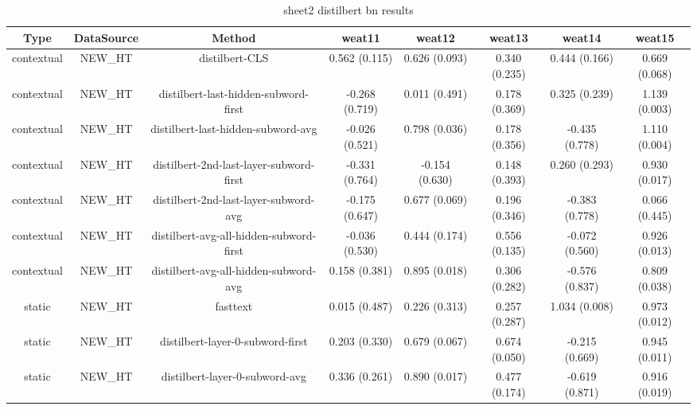 \begin{sidewaystable}[htb]
    \centering
    \caption{sheet2 distilbert bn results}
    \label{appendix_tab:sheet2_distilbert_bn_results}
    \small
    \begin{tabular}{@{}cccccccc@{}}
        \toprule
        Type & DataSource & Method & weat11 & weat12 & weat13 & weat14 & weat15 \\
        \midrule
        contextual & NEW\_HT & distilbert-CLS & 0.562 (0.115) & 0.626 (0.093) & 0.340 (0.235) & 0.444 (0.166) & 0.669 (0.068) \\
        contextual & NEW\_HT & distilbert-last-hidden-subword-first & -0.268 (0.719) & 0.011 (0.491) & 0.178 (0.369) & 0.325 (0.239) & 1.139 (0.003) \\
        contextual & NEW\_HT & distilbert-last-hidden-subword-avg & -0.026 (0.521) & 0.798 (0.036) & 0.178 (0.356) & -0.435 (0.778) & 1.110 (0.004) \\
        contextual & NEW\_HT & distilbert-2nd-last-layer-subword-first & -0.331 (0.764) & -0.154 (0.630) & 0.148 (0.393) & 0.260 (0.293) & 0.930 (0.017) \\
        contextual & NEW\_HT & distilbert-2nd-last-layer-subword-avg & -0.175 (0.647) & 0.677 (0.069) & 0.196 (0.346) & -0.383 (0.778) & 0.066 (0.445) \\
        contextual & NEW\_HT & distilbert-avg-all-hidden-subword-first & -0.036 (0.530) & 0.444 (0.174) & 0.556 (0.135) & -0.072 (0.560) & 0.926 (0.013) \\
        contextual & NEW\_HT & distilbert-avg-all-hidden-subword-avg & 0.158 (0.381) & 0.895 (0.018) & 0.306 (0.282) & -0.576 (0.837) & 0.809 (0.038) \\
        static & NEW\_HT & fasttext & 0.015 (0.487) & 0.226 (0.313) & 0.257 (0.287) & 1.034 (0.008) & 0.973 (0.012) \\
        static & NEW\_HT & distilbert-layer-0-subword-first & 0.203 (0.330) & 0.679 (0.067) & 0.674 (0.050) & -0.215 (0.669) & 0.945 (0.011) \\
        static & NEW\_HT & distilbert-layer-0-subword-avg & 0.336 (0.261) & 0.890 (0.017) & 0.477 (0.174) & -0.619 (0.871) & 0.916 (0.019) \\
        \bottomrule
    \end{tabular}
\end{sidewaystable}